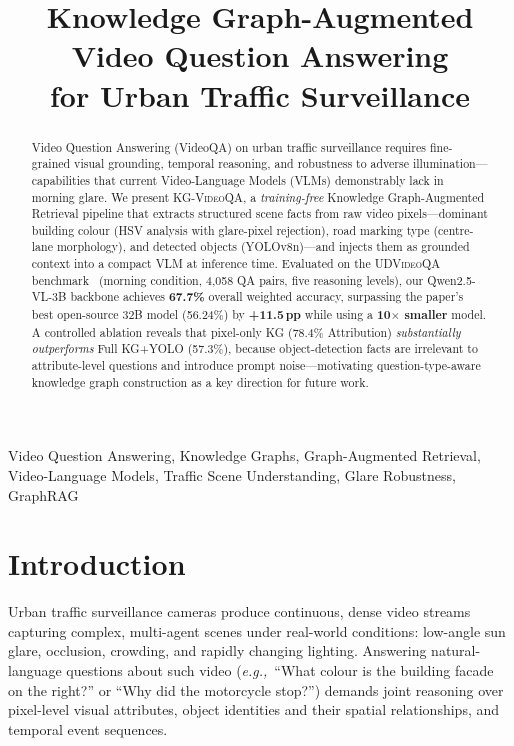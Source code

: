 \documentclass[10pt,conference,compsoc]{IEEEtran}
\title{Knowledge Graph-Augmented Video Question Answering\\
       for Urban Traffic Surveillance}
\author{%
  \IEEEauthorblockN{Abhinay Prakash}
  \IEEEauthorblockA{%
    Dept.\ of Computer Science \& Engineering\\
    Indraprastha Institute of Information Technology Delhi (IIIT-D)\\
    New Delhi, India
  }
}
\newcommand{\ours}{\textsc{KG-VideoQA}}
\newcommand{\dataset}{\textsc{UDVideoQA}}
\newcommand{\pp}{\,pp}                     %
\newcommand{\eg}{\textit{e.g.,}~}
\begin{document}
\sloppy                        %
\setlength{\emergencystretch}{3em}  %
\maketitle

\begin{abstract}
Video Question Answering (VideoQA) on urban traffic surveillance
requires fine-grained visual grounding, temporal reasoning, and
robustness to adverse illumination---capabilities that current
Video-Language Models (VLMs) demonstrably lack in morning glare.
We present \ours{}, a \emph{training-free} Knowledge Graph-Augmented
Retrieval pipeline that extracts structured scene facts from raw
video pixels---dominant building colour (HSV analysis with
glare-pixel rejection), road marking type (centre-lane morphology),
and detected objects (YOLOv8n)---and injects them as grounded
context into a compact VLM at inference time.
Evaluated on the \dataset{} benchmark~\cite{udvideoqa2026}
(morning condition, 4{,}058 QA pairs, five reasoning levels),
our Qwen2.5-VL-3B backbone achieves \textbf{67.7\%} overall
weighted accuracy, surpassing the paper's best open-source 32B
model (56.24\%) by \textbf{+11.5\pp} while using a
\textbf{10$\boldsymbol{\times}$ smaller} model.
A controlled ablation reveals that pixel-only KG (78.4\% Attribution)
\emph{substantially outperforms} Full KG+YOLO (57.3\%), because
object-detection facts are irrelevant to attribute-level questions
and introduce prompt noise---motivating question-type-aware
knowledge graph construction as a key direction for future work.
\end{abstract}

\begin{IEEEkeywords}
Video Question Answering, Knowledge Graphs, Graph-Augmented
Retrieval, Video-Language Models, Traffic Scene Understanding,
Glare Robustness, GraphRAG
\end{IEEEkeywords}


\section{Introduction}
\label{sec:intro}

Urban traffic surveillance cameras produce continuous, dense video
streams capturing complex, multi-agent scenes under real-world
conditions: low-angle sun glare, occlusion, crowding, and rapidly
changing lighting.
Answering natural-language questions about such video
(\eg ``What colour is the building facade on the right?'' or
``Why did the motorcycle stop?'') demands joint reasoning over
pixel-level visual attributes, object identities and their
spatial relationships, and temporal event sequences.
\end{document}
